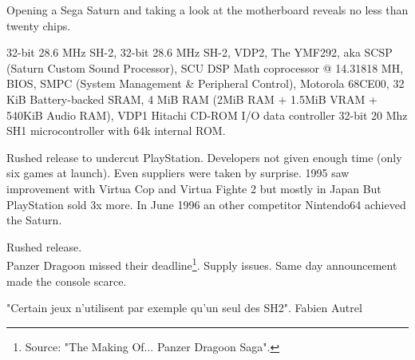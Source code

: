 \par
Opening a Sega Saturn and taking a look at the motherboard reveals no less than twenty chips.\\
\par
{} 32-bit 28.6 MHz SH-2, 
 32-bit 28.6 MHz SH-2, 
 VDP2, 
 The YMF292, aka SCSP (Saturn Custom Sound Processor), 
 SCU DSP Math coprocessor @ 14.31818 MH, 
 BIOS, 
 SMPC (System Management \& Peripheral Control), 
 Motorola 68CE00, 
 32 KiB Battery-backed SRAM, 
 4 MiB RAM (2MiB RAM + 1.5MiB VRAM + 540KiB Audio RAM), 
 VDP1 
 Hitachi CD-ROM I/O data controller
 32-bit 20 Mhz SH1  microcontroller with 64k internal ROM.


\par
Rushed release to undercut PlayStation. Developers not given enough time (only six games at launch). Even suppliers were taken by surprise. 1995 saw improvement with Virtua Cop and Virtua Fighte 2 but mostly in Japan  But PlayStation sold 3x more. In June 1996 an other competitor Nintendo64 achieved the Saturn.
\par
Rushed release.\\
Panzer Dragoon missed their deadline\footnote{Source: "The Making Of... Panzer Dragoon Saga".}.
Supply issues. Same day announcement made the console scarce.



"Certain jeux n'utilisent par exemple qu'un seul des SH2". Fabien Autrel







